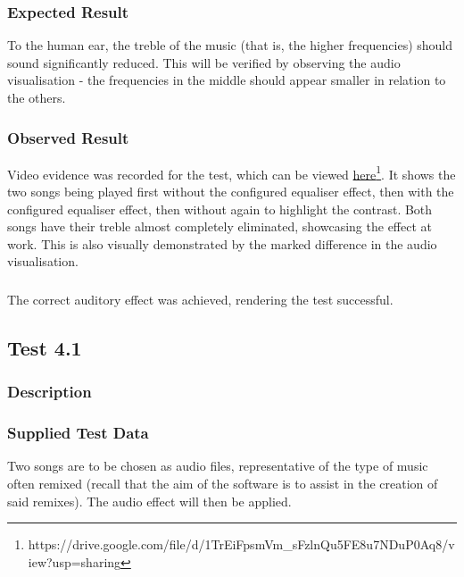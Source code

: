 \subsubsection{Expected Result}
To the human ear, the treble of the music (that is, the higher frequencies) should sound significantly reduced. This will be verified by observing the audio visualisation - the frequencies in the middle should appear smaller in relation to the others.

\subsubsection{Observed Result}
\label{sec:evidence3.2}
Video evidence was recorded for the test, which can be viewed \href{https://drive.google.com/file/d/1TrEiFpsmVm_sFzlnQu5FE8u7NDuP0Aq8/view?usp=sharing}{here}\footnote{
	https://drive.google.com/file/d/1TrEiFpsmVm\_sFzlnQu5FE8u7NDuP0Aq8/view?usp=sharing
}. It shows the two songs being played first without the configured equaliser effect, then with the configured equaliser effect, then without again to highlight the contrast. Both songs have their treble almost completely eliminated, showcasing the effect at work. This is also visually demonstrated by the marked difference in the audio visualisation.

\subsubsection{}
The correct auditory effect was achieved, rendering the test successful. 


\pagebreak
\subsection{Test 4.1}
\subsubsection{Description}
\paragraph{}
{
	\centering
}

\subsubsection{Supplied Test Data}
Two songs are to be chosen as audio files, representative of the type of music often remixed (recall that the aim of the software is to assist in the creation of said remixes). The audio effect will then be applied.

